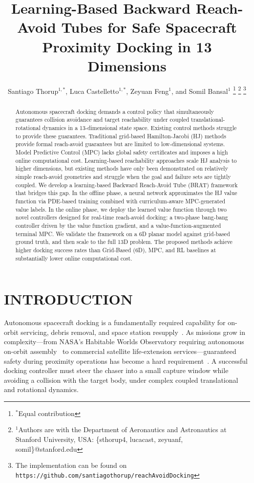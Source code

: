 \documentclass[letterpaper, 10 pt, conference]{ieeeconf}
\title{\LARGE \bf
Learning-Based Backward Reach-Avoid Tubes for Safe Spacecraft Proximity Docking in 13 Dimensions
}
\author{Santiago Thorup$^{1,*}$, Luca Castelletto$^{1,*}$, Zeyuan Feng$^{1}$, and Somil Bansal$^{1}$%
\thanks{$^{*}$Equal contribution}%
\thanks{$^{1}$Authors are with the Department of Aeronautics and Astronautics at Stanford University, USA: \{sthorup4, lucacast, zeyuanf, somil\}@stanford.edu}%
\thanks{The implementation can be found on \texttt{https://github.com/santiagothorup/reachAvoidDocking}}
}
\begin{document}
\maketitle
\thispagestyle{empty}
\pagestyle{empty}

\begin{abstract}
Autonomous spacecraft docking demands a control policy that simultaneously guarantees collision avoidance and target reachability under coupled translational-rotational dynamics in a 13-dimensional state space. Existing control methods struggle to provide these guarantees. Traditional grid-based Hamilton-Jacobi (HJ) methods provide formal reach-avoid guarantees but are limited to low-dimensional systems. Model Predictive Control (MPC) lacks global safety certificates and imposes a high online computational cost. Learning-based reachability approaches scale HJ analysis to higher dimensions, but existing methods have only been demonstrated on relatively simple reach-avoid geometries and struggle when the goal and failure sets are tightly coupled. We develop a learning-based Backward Reach-Avoid Tube (BRAT) framework that bridges this gap. In the offline phase, a neural network approximates the HJ value function via PDE-based training combined with curriculum-aware MPC-generated value labels. In the online phase, we deploy the learned value function through two novel controllers designed for real-time reach-avoid docking: a two-phase bang-bang controller driven by the value function gradient, and a value-function-augmented terminal MPC. We validate the framework on a 6D planar model against grid-based ground truth, and then scale to the full 13D problem. The proposed methods achieve higher docking success rates than Grid-Based (6D), MPC, and RL baselines at substantially lower online computational cost.
\end{abstract}

\section{INTRODUCTION}

Autonomous spacecraft docking is a fundamentally required capability for on-orbit servicing, debris removal, and space station resupply~\cite{fehse2003}. As missions grow in complexity---from NASA's Habitable Worlds Observatory requiring autonomous on-orbit assembly~\cite{NAP26141} to commercial satellite life-extension services---guaranteed safety during proximity operations has become a hard requirement~\cite{Petersen2023}. A successful docking controller must steer the chaser into a small capture window while avoiding a collision with the target body, under complex coupled translational and rotational dynamics.
\end{document}

